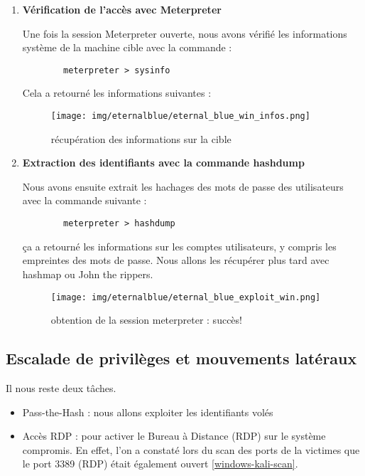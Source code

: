 \documentclass[a4paper,12pt]{report}
\begin{document}
\begin{enumerate}
    
    \item \textbf{Vérification de l'accès avec Meterpreter}
    
    Une fois la session Meterpreter ouverte, nous avons vérifié les informations système de la machine cible avec la commande :
        \begin{lstlisting}
        meterpreter > sysinfo
        \end{lstlisting}
     Cela a retourné les informations suivantes :
       
        \begin{figure}[H] 
      \label{windows-kali-info-cible}
        \centering
          \texttt{[image: img/eternalblue/eternal\_blue\_win\_infos.png]} 
        \caption{récupération des informations sur la cible}
    \end{figure}
       
    
    \item \textbf{Extraction des identifiants avec la commande hashdump}
    
     Nous avons ensuite extrait les hachages des mots de passe des utilisateurs avec la commande suivante :
        \begin{lstlisting}
        meterpreter > hashdump
        \end{lstlisting}
       ça a  retourné les informations sur les comptes utilisateurs, y compris les empreintes des mots de passe. Nous allons les récupérer plus tard avec hashmap ou John the rippers.
        
  \begin{figure}[H] 
      \label{windows-kali-search-exploit}
        \centering
          \texttt{[image: img/eternalblue/eternal\_blue\_exploit\_win.png]} 
        \caption{obtention de la session meterpreter : succès!}
    \end{figure}
\end{enumerate}


\subsection{Escalade de privilèges et mouvements latéraux}
Il nous reste deux tâches. 
\begin{itemize}
    \item Pass-the-Hash : nous allons exploiter les identifiants volés
    \item Accès RDP : pour activer le Bureau à Distance (RDP) sur le système compromis. En effet,
    l'on a constaté lors du scan des ports de la victimes que le port 3389 (RDP) était également ouvert \ref{windows-kali-scan}. 
\end{itemize}
\end{document}
